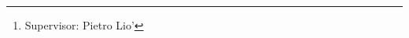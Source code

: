 \documentclass[a4paper,twoside,draft]{report}
\begin{document}
\author{Maxwell Conway \thanks{Supervisor: Pietro Lio'}}
\date{}
\begin{abstract}

\end{abstract}








\appendix
\end{document}
